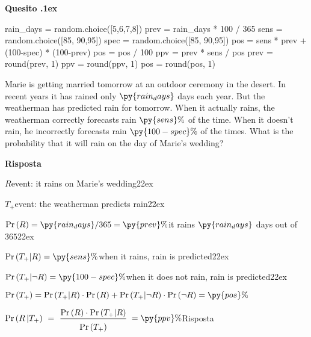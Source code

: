 \documentclass[11pt,twoside,a4paper]{article}
\def\Pr{{\rm Pr\,}}
\newcounter{quesito}
\newenvironment{question}{\bigskip\addtocounter{quesito}{1}\par\textbf{Quesito \thequesito.\kern1ex}}{\vspace{\parskip}}
\newenvironment{answer}{\par\textbf{Risposta\quad}}{\vspace{\parskip}}
\begin{document}
\begin{question}
\begin{pycode}
rain_days = random.choice([5,6,7,8])
prev = rain_days * 100 / 365
sens =  random.choice([85, 90,95])
spec = random.choice([85, 90,95])
pos =  sens * prev + (100-spec) * (100-prev)
pos = pos / 100
ppv =  prev * sens  / pos
prev = round(prev, 1)
ppv = round(ppv, 1)
pos = round(pos, 1)
\end{pycode}
Marie is getting married tomorrow at an outdoor ceremony in the desert. In recent years it has rained only $\py{rain_days}$ days each year. But the weatherman has predicted rain for tomorrow. When it actually rains, the weatherman correctly forecasts rain $\py{sens}\%$ of the time. When it doesn’t rain, he incorrectly forecasts rain $\py{100-spec}\%$ of the times. What is the probability that it will rain on the day of Marie’s wedding?

\begin{answer}

$R$\hfill event: it rains on Marie’s wedding\kern22ex

$T_+$\hfill event: the weatherman predicts rain\kern22ex

$\Pr(R) =\py{rain_days}/365 = \py{prev}\%$\hfill it rains $\py{rain_days}$ days out of $365$\kern22ex

$\Pr(T_+|R) = \py{sens}\%$\hfill when it rains, rain is predicted\kern22ex

$\Pr(T_+|\neg R) = \py{100-spec}\%$\hfill when it does not rain,  rain is predicted\kern22ex

$\Pr(T_+) = \Pr(T_+|R)\cdot \Pr(R)+ \Pr(T_+|\neg R)\cdot \Pr(\neg R) = \py{pos}\%$ 

$\displaystyle \Pr(R\,| T_+)\ =\ \frac{\Pr(R)\cdot \Pr(T_+|R)}{\Pr(T_+)\vphantom{\Big[}}$  {\color{blue} $=\py{ppv}\%$\hfill Risposta}

\end{answer}
\end{question}
\end{document}
